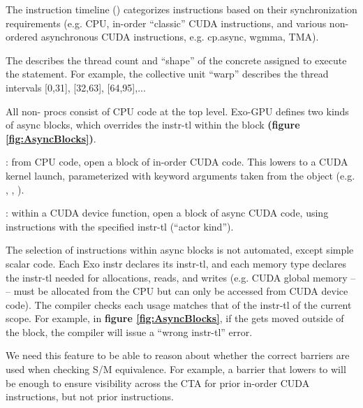 \filbreak
The instruction timeline () categorizes instructions based on their synchronization requirements (e.g. CPU, in-order ``classic'' CUDA instructions, and various non-ordered asynchronous CUDA instructions, e.g. cp.async, wgmma, TMA).

\filbreak
The  describes the thread count and ``shape'' of the concrete  assigned to execute the statement.
For example, the collective unit ``warp'' describes the thread intervals [0,31], [32,63], [64,95],...

\filbreak
{}


\begin{figure*}[!b]

\caption{Example async blocks, with sm\_80 cp.async instructions used}
\label{fig:AsyncBlocks}
\end{figure*}

All non- procs consist of CPU code at the top level.
Exo-GPU defines two kinds of async blocks, which overrides the instr-tl within the block \textbf{(figure \ref{fig:AsyncBlocks})}.

\filbreak
{}: from CPU code, open a block of in-order CUDA code.
This lowers to a CUDA kernel launch, parameterized with keyword arguments taken from the  object (e.g. , , ).

\filbreak
{}: within a CUDA device function, open a block of async CUDA code, using instructions with the specified instr-tl (``actor kind'').

\filbreak
The selection of instructions within async blocks is not automated, except simple scalar code.
Each Exo instr declares its instr-tl, and each memory type declares the instr-tl needed for allocations, reads, and writes (e.g. CUDA global memory --  -- must be allocated from the CPU but can only be accessed from CUDA device code).
The compiler checks each usage matches that of the instr-tl of the current scope.
For example, in \textbf{figure \ref{fig:AsyncBlocks}}, if the  gets moved outside of the  block, the compiler will issue a ``wrong instr-tl'' error.

 We need this feature to be able to reason about whether the correct barriers are used when checking S/M equivalence. For example, a barrier that lowers to  will be enough to ensure visibility across the CTA for prior in-order CUDA instructions, but not prior  instructions.

